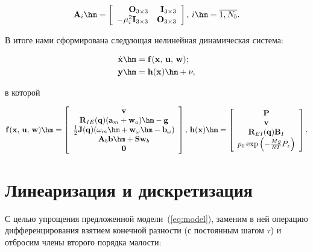\documentclass[
  AUTHOR={Симаков, В.А.},
  TITLE={Управление ориентацией беспилотных систем},
  SUBJECT={Проблемы навигации летательных аппаратов},
  SOURCE={./\jobname.zip},
  12pt,oneside]{commart}
\begin{document}
\begin{equation}
\nonumber
\mathbf{A}_i\hm=\left[\begin{array}{rr}
\mathbf{O}_{3\times 3}&\mathbf{I}_{3\times 3}\\
-\mu_i^2\mathbf{I}_{3\times 3}&\mathbf{O}_{3\times 3}
\end{array}\right],\,i\hm=\overline{1,N_b}.
\end{equation}

В итоге нами сформирована следующая нелинейная динамическая система:

\begin{equation}
\label{eq:model}
\begin{aligned}
&\dot{\mathbf{x}}\hm=\mathbf{f}(\mathbf{x},\,\mathbf{u},\,\mathbf{w});\\
&\mathbf{y}\hm=\mathbf{h}(\mathbf{x})\hm+\mathbf{\nu},
\end{aligned}
\end{equation}

\noindent в которой

\begin{equation}
\label{eq:model_right}
\mathbf{f}(\mathbf{x},\,\mathbf{u},\,\mathbf{w})\hm=\left[\begin{array}{c}
\mathbf{v}\\
\mathbf{R}_{IE}(\mathbf{q})(\mathbf{a}_m+\mathbf{w}_a)\hm-\mathbf{g}\\
\frac{1}{2}\mathbf{J}(\mathbf{q})(\mathbf{\omega}_m\hm+\mathbf{w}_{\omega}\hm-\mathbf{b}_{\omega})\\
\mathbf{A}_b\mathbf{b}\hm+\mathbf{Sw}_b\\
\mathbf{0}
\end{array}\right],\,
\mathbf{h}(\mathbf{x})\hm=\left[\begin{array}{c}
\mathbf{P}\\
\mathbf{v}\\
\mathbf{R}_{EI}(\mathbf{q})\mathbf{B}_I\\
p_0\exp\left(-\frac{Mg}{RT}P_z\right)
\end{array}\right].
\end{equation}

\section*{Линеаризация и дискретизация}

С целью упрощения предложенной модели~(\ref{eq:model}), заменим в ней операцию дифференцирования взятием конечной разности (с постоянным шагом $\tau$) и отбросим члены второго порядка малости:
\end{document}
